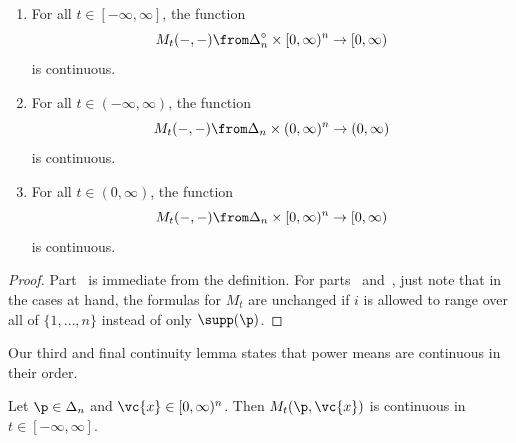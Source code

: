 \begin{lemma}
% 
\begin{enumerate}
\item 
{}
For all $t \in [-\infty, \infty]$, the function
\[
M_t(-, -) \from \Delta_n^\circ \times [0, \infty)^n \to [0, \infty)
\]
is continuous.

\item 
{}
For all $t \in (-\infty, \infty)$, the function
\[
M_t(-, -) \from \Delta_n \times (0, \infty)^n \to (0, \infty)
\]
is continuous.

\item 
{}
For all $t \in (0, \infty)$, the function
\[
M_t(-, -) \from \Delta_n \times [0, \infty)^n \to [0, \infty)
\]
is continuous.
\end{enumerate}
\end{lemma}

\begin{proof}
Part~ is immediate from the definition.  For
parts~ and~, just
note that in the cases at hand, the formulas for $M_t$ are unchanged if $i$
is allowed to range over all of $\{1, \ldots, n\}$ instead of only
$\supp(\p)$.
\end{proof}

Our third and final continuity lemma states that power means are continuous
in their order.

\begin{lemma}
% 
Let $\p \in \Delta_n$ and $\vc{x} \in [0, \infty)^n$.  Then $M_t(\p,
  \vc{x})$ is continuous in $t \in [-\infty, \infty]$.
\end{lemma}

